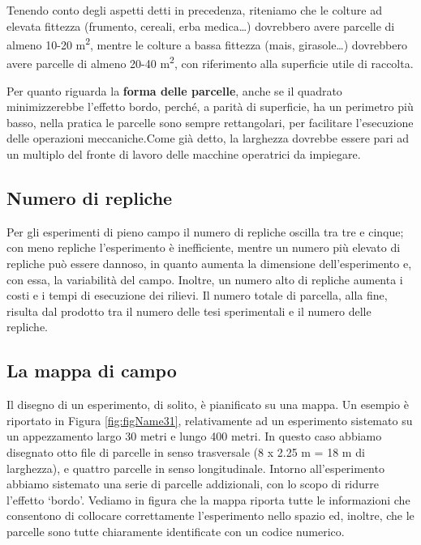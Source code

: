 \documentclass[
  12pt,
]{book}
\begin{document}
Tenendo conto degli aspetti detti in precedenza, riteniamo che le colture ad elevata fittezza (frumento, cereali, erba medica\ldots) dovrebbero avere parcelle di almeno 10-20 m\textsuperscript{2}, mentre le colture a bassa fittezza (mais, girasole\ldots) dovrebbero avere parcelle di almeno 20-40 m\textsuperscript{2}, con riferimento alla superficie utile di raccolta.

Per quanto riguarda la \textbf{forma delle parcelle}, anche se il quadrato minimizzerebbe l'effetto bordo, perché, a parità di superficie, ha un perimetro più basso, nella pratica le parcelle sono sempre rettangolari, per facilitare l'esecuzione delle operazioni meccaniche.Come già detto, la larghezza dovrebbe essere pari ad un multiplo del fronte di lavoro delle macchine operatrici da impiegare.

\hypertarget{numero-di-repliche}{%
\subsection{Numero di repliche}\label{numero-di-repliche}}

Per gli esperimenti di pieno campo il numero di repliche oscilla tra tre e cinque; con meno repliche l'esperimento è inefficiente, mentre un numero più elevato di repliche può essere dannoso, in quanto aumenta la dimensione dell'esperimento e, con essa, la variabilità del campo. Inoltre, un numero alto di repliche aumenta i costi e i tempi di esecuzione dei rilievi. Il numero totale di parcella, alla fine, risulta dal prodotto tra il numero delle tesi sperimentali e il numero delle repliche.

\hypertarget{la-mappa-di-campo}{%
\subsection{La mappa di campo}\label{la-mappa-di-campo}}

Il disegno di un esperimento, di solito, è pianificato su una mappa. Un esempio è riportato in Figura \ref{fig:figName31}, relativamente ad un esperimento sistemato su un appezzamento largo 30 metri e lungo 400 metri. In questo caso abbiamo disegnato otto file di parcelle in senso trasversale (8 x 2.25 m = 18 m di larghezza), e quattro parcelle in senso longitudinale. Intorno all'esperimento abbiamo sistemato una serie di parcelle addizionali, con lo scopo di ridurre l'effetto `bordo'. Vediamo in figura che la mappa riporta tutte le informazioni che consentono di collocare correttamente l'esperimento nello spazio ed, inoltre, che le parcelle sono tutte chiaramente identificate con un codice numerico.
\end{document}
